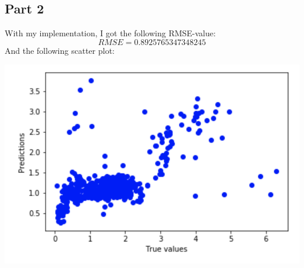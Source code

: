 \documentclass{report}
\begin{document}
\subsection*{Part 2}
With my implementation, I got the following RMSE-value:
$$RMSE = 0.8925765347348245$$
And the following scatter plot:
\begin{center}
    \includegraphics[height = 7 cm]{LinRegNeighbors_scatter.png}
\end{center}
\end{document}
